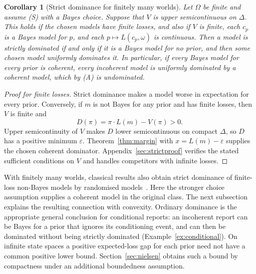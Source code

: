 \documentclass[11pt]{article}
\newtheorem{corollary}[theorem]{Corollary}
\theoremstyle{definition}
\theoremstyle{remark}
\begin{document}
\begin{corollary}[Strict dominance for finitely many worlds]\label{cor:strict}
Let $\Omega$ be finite and assume (S) with a Bayes choice. Suppose that $V$ is upper semicontinuous on $\Delta$. This holds if the chosen models have finite losses, and also if $V$ is finite, each $c_p$ is a Bayes model for $p$, and each $p\mapsto L(c_p,\omega)$ is continuous. Then a model is strictly dominated if and only if it is a Bayes model for no prior, and then some chosen model uniformly dominates it. In particular, if every Bayes model for every prior is coherent, every incoherent model is uniformly dominated by a coherent model, which by (A) is undominated.
\end{corollary}
\begin{proof}[Proof for finite losses]
Strict dominance makes a model worse in expectation for every prior. Conversely, if $m$ is not Bayes for any prior and has finite losses, then $V$ is finite and
\[
 D(\pi)=\pi\cdot L(m)-V(\pi)>0.
\]
Upper semicontinuity of $V$ makes $D$ lower semicontinuous on compact $\Delta$, so $D$ has a positive minimum $\varepsilon$. Theorem~\ref{thm:margin} with $x=L(m)-\varepsilon$ supplies the chosen coherent dominator. Appendix~\ref{sec:strictproof} verifies the stated sufficient conditions on $V$ and handles competitors with infinite losses.
\end{proof}
With finitely many worlds, classical results also obtain strict dominance of finite-loss non-Bayes models by randomised models~\cite[Theorem~7]{SSK09}. Here the stronger choice assumption supplies a coherent model in the original class. The next subsection explains the resulting connection with convexity. Ordinary dominance is the appropriate general conclusion for conditional reports: an incoherent report can be Bayes for a prior that ignores its conditioning event, and can then be dominated without being strictly dominated (Example~\ref{ex:conditional}). On infinite state spaces a positive expected-loss gap for each prior need not have a common positive lower bound. Section~\ref{sec:nielsen} obtains such a bound by compactness under an additional boundedness assumption.
\end{document}
